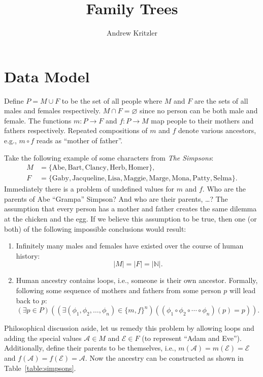 \documentclass[letterpaper]{article}
\title{Family Trees}
\author{Andrew Kritzler}
\begin{document}
\maketitle

\section{Data Model}

Define \(P = M \cup F\) to be the set of all people where \(M\) and \(F\) are the sets of all males and females respectively.
\(M \cap F = \varnothing{}\) since no person can be both male and female.
The functions \(m : P \to F\) and \(f : P \to M\) map people to their mothers and fathers respectively.
Repeated compositions of \(m\) and \(f\) denote various ancestors, e.g., \(m \circ f\) reads as ``mother of father''.

Take the following example of some characters from \textit{The Simpsons}:
\begin{align*}
    M & = \{\text{Abe}, \text{Bart}, \text{Clancy}, \text{Herb}, \text{Homer}\},                                                 \\
    F & = \{\text{Gaby}, \text{Jacqueline}, \text{Lisa}, \text{Maggie}, \text{Marge}, \text{Mona}, \text{Patty}, \text{Selma}\}.
\end{align*}
Immediately there is a problem of undefined values for \(m\) and \(f\).
Who are the parents of Abe ``Grampa'' Simpson?
And who are their parents, \dots?
The assumption that every person has a mother and father creates the same dilemma at the chicken and the egg.
If we believe this assumption to be true, then one (or both) of the following impossible conclusions would result:
\begin{enumerate}
    \item Infinitely many males and females have existed over the course of human history:
          \[
              |M| = |F| = |\mathbb{N}|.
          \]
    \item Human ancestry contains loops, i.e., someone is their own ancestor. Formally, following some sequence of mothers and fathers from some person \(p\) will lead back to \(p\):
          \[
              (\exists p \in P)
              (
              (\exists (\phi_1, \phi_2, \dotsc, \phi_n) \in {\{m, f\}}^n)
              ( (\phi_1 \circ \phi_2 \circ \cdots \circ \phi_n)(p) = p)
              ).
          \]
\end{enumerate}

Philosophical discussion aside, let us remedy this problem by allowing loops and adding the special values \(\mathcal{A} \in M\) and \(\mathcal{E} \in F\) (to represent ``Adam and Eve'').
Additionally, define their parents to be themselves, i.e., \(m(\mathcal{A}) = m(\mathcal{E}) = \mathcal{E}\) and \(f(\mathcal{A}) = f(\mathcal{E}) = \mathcal{A}\).
Now the ancestry can be constructed as shown in Table~\ref{table:simpsons}.
\end{document}
